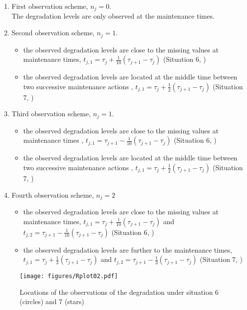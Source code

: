 \begin{enumerate}
\item First observation scheme, $n_j=0$. \\
The degradation levels are only observed at the maintenance times.
\item Second observation scheme, $n_j=1$.
\begin{itemize}
\item the observed degradation levels are close to the missing values at maintenance times, 
 $t_{j,1}=\tau_j+\frac{1}{10}(\tau_{j+1}-\tau_j)$ (Situation 6,  )
\item the observed degradation levels are located at the middle time between two successive maintenance actions , 
$t_{j,1}= \tau_j+\frac{1}{2}(\tau_{j+1}-\tau_j)$ (Situation 7,  )
\end{itemize}
\item Third observation scheme, $n_j=1$.
\begin{itemize}
\item the observed degradation levels  are close to the missing values at maintenance times , 
$t_{j,1}=\tau_{j+1}-\frac{1}{10}(\tau_{j+1}-\tau_j)$ (Situation 6, )
\item the observed degradation levels are located at the middle time between two successive maintenance actions ,
$t_{j,1}= \tau_j+\frac{1}{2}(\tau_{j+1}-\tau_j)$  (Situation 7, )
\end{itemize}
\item Fourth observation scheme, 
$n_j=2$
\begin{itemize}
\item the observed degradation levels are close to the missing values at maintenance times, 
$t_{j,1}= \tau_j+\frac{1}{10}(\tau_{j+1}-\tau_j)$ and $t_{j,2}= \tau_{j+1}-\frac{1}{10} (\tau_{j+1}-\tau_j)$ (Situation 6, )
\item the observed degradation levels are further to the maintenance times,
$t_{j,1}=\tau_j+\frac{1}{3}(\tau_{j+1}-\tau_j)$ and $t_{j,2}=\tau_{j+1}-\frac{1}{3}(\tau_{j+1}-\tau_j)$ (Situation 7, ) 
\end{itemize}
\end{enumerate}

\begin{figure}[h!]
\centering
\texttt{[image: figures/Rplot02.pdf]} 
\caption{Locations of the observations of the degradation under situation 6 (circles) and  7 (stars)} 
\label{fig:laurent}
\end{figure}

